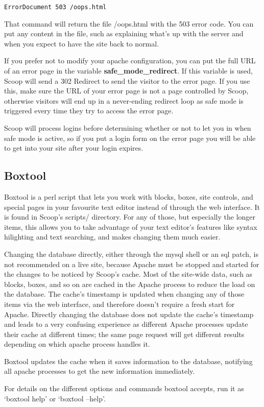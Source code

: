 \begin{verbatim}
ErrorDocument 503 /oops.html
\end{verbatim}

That command will return the file /oops.html with the 503 error code. You can put any content in the file, such as explaining what's up with the server and when you expect to have the site back to normal.

If you prefer not to modify your apache configuration, you can put the full URL of an error page in the variable {\bf safe\_mode\_redirect}. If this variable is used, Scoop will send a 302 Redirect to send the visitor to the error page. If you use this, make sure the URL of your error page is not a page controlled by Scoop, otherwise visitors will end up in a never-ending redirect loop as safe mode is triggered every time they try to access the error page.

Scoop will process logins before determining whether or not to let you in when safe mode is active, so if you put a login form on the error page you will be able to get into your site after your login expires.

\subsection{Boxtool}
\label{features-boxtool}

Boxtool is a perl script that lets you work with blocks, boxes, site controls, and special pages in your favourite text editor instead of through the web interface. It is found in Scoop's scripts/ directory. For any of those, but especially the longer items, this allows you to take advantage of your text editor's features like syntax hilighting and text searching, and makes changing them much easier.

Changing the database directly, either through the mysql shell or an sql patch, is not recommended on a live site, because Apache must be stopped and started for the changes to be noticed by Scoop's cache. Most of the site-wide data, such as blocks, boxes, and so on are cached in the Apache process to reduce the load on the database. The cache's timestamp is updated when changing any of those items via the web interface, and therefore doesn't require a fresh start for Apache. Directly changing the database does not update the cache's timestamp and leads to a very confusing experience as different Apache processes update their cache at different times; the same page request will get different results depending on which apache process handles it.

Boxtool updates the cache when it saves information to the database, notifying all apache processes to get the new information immediately.

For details on the different options and commands boxtool accepts, run it as `boxtool help' or `boxtool --help'.


